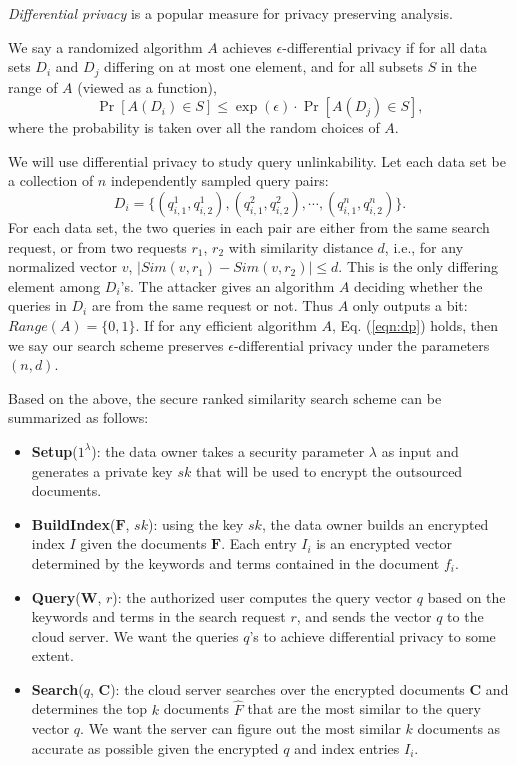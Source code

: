 \documentclass{IEEEtran}
\begin{document}
\emph{Differential privacy} \cite{Dwork08,DR14} is a popular measure for privacy preserving analysis. 
\begin{definition}
We say a randomized algorithm $A$ achieves $\epsilon$-differential privacy if for all data sets $D_i$ and $D_j$ differing on at most one element, and for all subsets $S$ in the range of $A$ (viewed as a function),
\begin{equation}
\label{eqn:dp}
\Pr[A(D_i) \in S] \leq \exp(\epsilon)\cdot \Pr[A(D_j)\in S],
\end{equation}
where the probability is taken over all the random choices of $A$.
\end{definition}
We will use differential privacy to study query unlinkability. Let each data set be a collection of $n$ independently sampled query pairs: 
$$D_i = \{(q_{i,1}^1, q_{i,2}^1), (q_{i,1}^2, q_{i,2}^2), \cdots, (q_{i,1}^n, q_{i,2}^n)\}.$$
For each data set, the two queries in each pair are either from the same search request, or from two requests $r_1$, $r_2$ with similarity distance $d$, i.e., for any normalized vector $v$, $|Sim(v,r_1) - Sim(v,r_2)| \leq d$. This is the only differing element among $D_i$'s. The attacker gives an algorithm $A$ deciding whether the queries in $D_i$ are from the same request or not. Thus $A$ only outputs a bit: $Range(A) = \{0,1\}$. If for any efficient algorithm $A$, Eq. (\ref{eqn:dp}) holds, then we say our search scheme preserves $\epsilon$-differential privacy under the parameters $(n, d)$.

Based on the above, the secure ranked similarity search scheme can be summarized as follows:
\begin{itemize}
\item \textbf{Setup}($1^\lambda$): the data owner takes a security parameter $\lambda$ as input and generates a private key $sk$ that will be used to encrypt the outsourced documents.
\item \textbf{BuildIndex}($\mathbf{F}$, $sk$): using the key $sk$, the data owner builds an encrypted index $I$ given the documents $\mathbf{F}$. Each entry $I_i$ is an encrypted vector determined by the keywords and terms contained in the document $f_i$.
\item \textbf{Query}($\mathbf{W}$, $r$): the authorized user computes the query vector $q$ based on the keywords and terms in the search request $r$, and sends the vector $q$ to the cloud server. We want the queries $q$'s to achieve differential privacy to some extent.
\item \textbf{Search}($q$, $\mathbf{C}$): the cloud server searches over the encrypted documents $\mathbf{C}$ and determines the top $k$ documents $\hat{F}$ that are the most similar to the query vector $q$. We want the server can figure out the most similar $k$ documents as accurate as possible given the encrypted $q$ and index entries $I_i$.
\end{itemize}
\end{document}
